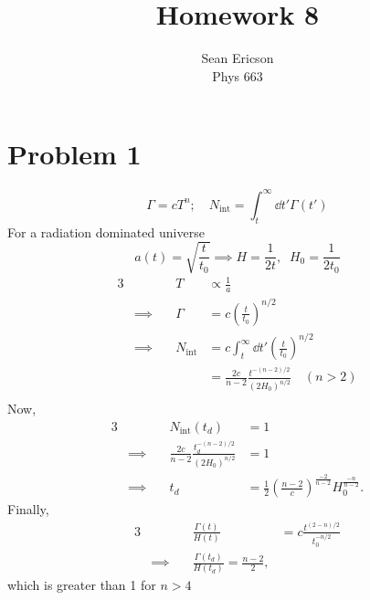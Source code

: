 \documentclass[12pt]{article}
\begin{document}
\title{Homework 8}
\author{Sean Ericson \\ Phys 663}
\maketitle

\section*{Problem 1}
\[ \Gamma = cT^n; \quad N_\text{int} = \int_t^\infty \dd t' \Gamma(t') \]
For a radiation dominated universe
\[ a(t) = \sqrt{\frac{t}{t_0}} \implies H = \frac{1}{2t}, \;\; H_0 = \frac{1}{2t_0} \]
\begin{alignat*}{3}
    & \quad & T &\propto \frac{1}{a} \\
    &\implies\quad & \Gamma &= c\left(\frac{t}{t_0}\right)^{n/2} \\
    &\implies\quad & N_\text{int} &= c\int_t^\infty \dd t' \left(\frac{t}{t_0}\right)^{n/2} \\
    & \quad &   &= \frac{2c}{n-2} \frac{t^{-(n-2)/2}}{(2H_0)^{n/2}} \quad (n > 2) \\
\end{alignat*}
Now,
\begin{alignat*}{3}
    & \quad & N_\text{int}(t_d) &= 1 \\
    &\implies\quad & \frac{2c}{n-2} \frac{t_d^{-(n-2)/2}}{(2H_0)^{n/2}} &= 1 \\
    &\implies\quad & t_d &= \frac{1}{2}\left(\frac{n-2}{c}\right)^{\frac{-2}{n-2}}H_0^{\frac{-n}{n-2}}.
\end{alignat*}
Finally,
\begin{alignat*}{3}
    & \quad & \frac{\Gamma(t)}{H(t)} &= c \frac{t^{(2-n)/2}}{t_0^{-n/2}} \\
    &\implies\quad & \frac{\Gamma(t_d)}{H(t_d)} = \frac{n-2}{2},
\end{alignat*}
which is greater than 1 for $n>4$
\end{document}
